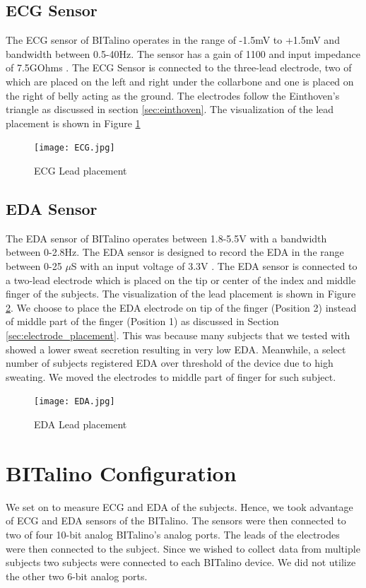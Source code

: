 \subsection{ECG Sensor}
The ECG sensor of BITalino operates in the range of -1.5mV to +1.5mV and bandwidth between 0.5-40Hz. The sensor has a gain of 1100 and input impedance of 7.5GOhms \cite{ecg_datasheet}. The ECG Sensor is connected to the three-lead electrode, two of which are placed on the left and right under the collarbone and one is placed on the right of belly acting as the ground. The electrodes follow the Einthoven's triangle as discussed in section \ref{sec:einthoven}. The visualization of the lead placement is shown in Figure \ref{fig:ecg_lead_placement}
\begin{figure}
\centering
\texttt{[image: ECG.jpg]}
\caption{ECG Lead placement}
\label{fig:ecg_lead_placement}
\end{figure}
\subsection{EDA Sensor}
\label{sec:eda_sensor}
The EDA sensor of BITalino operates between 1.8-5.5V with a bandwidth between 0-2.8Hz. The EDA sensor is designed to record the EDA in the range between 0-25 $\mu$S with an input voltage of 3.3V \cite{eda_datasheet}. The EDA sensor is connected to a two-lead electrode which is placed on the tip or center of the index and middle finger of the subjects. The visualization of the lead placement is shown in Figure \ref{fig:eda_lead_placement}. We choose to place the EDA electrode on tip of the finger (Position 2) instead of middle part of the finger (Position 1) as discussed in Section \ref{sec:electrode_placement}. This was because many subjects that we tested with showed a lower sweat secretion resulting in very low EDA. Meanwhile, a select number of subjects registered EDA over threshold of the device due to high sweating. We moved the electrodes to middle part of finger for such subject. 
\begin{figure}
\centering
\texttt{[image: EDA.jpg]}
\caption{EDA Lead placement}
\label{fig:eda_lead_placement}
\end{figure}

\section{BITalino Configuration}
We set on to measure ECG and EDA of the subjects. Hence, we took advantage of ECG and EDA sensors of the BITalino. The sensors were then connected to two of four 10-bit analog BITalino’s analog ports. The leads of the electrodes were then connected to the subject. Since we wished to collect data from multiple subjects two subjects were connected to each BITalino device. We did not utilize the other two 6-bit analog ports. 
